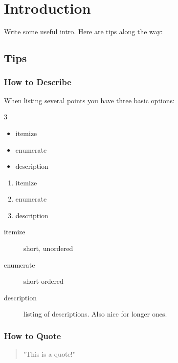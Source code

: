 \chapter{Introduction}
\label{sec:intro}       %
Write some useful intro. Here are tips along the way:

\section{Tips}
\subsection{How to Describe}
\setlength{\columnsep}{30 pt}
When listing several points you have three basic options:
\begin{multicols}{3}
    \begin{itemize}
        \item itemize
        \item enumerate
        \item description
    \end{itemize}

    \vfill\null
    \columnbreak

    \begin{enumerate}
        \item itemize
        \item enumerate
        \item description
    \end{enumerate}

    \vfill\null
    \columnbreak

    \begin{description}
        \item[itemize] short, unordered
        \item[enumerate] short ordered
        \item[description] listing of descriptions. Also nice for longer ones.
    \end{description}

\end{multicols}


\subsection{How to Quote}

\begin{quote}
    "This is a quote!"
\end{quote}

